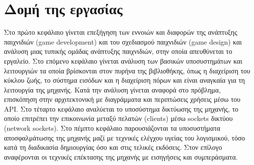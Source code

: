 \section{Δομή της εργασίας}
	Στο πρώτο κεφάλαιο γίνεται επεξήγηση των εννοιών και διαφορών της ανάπτυξης παιχνιδιών (game development) και του σχεδιασμού παιχνιδιών (game design) και ανάλυση μιας τυπικής ομάδας ανάπτυξης παιχνιδιών, στην οποία απευθύνεται το εργαλείο.
	Στο επόμενο κεφάλαιο γίνεται ανάλυση των βασικών υποσυστημάτων και λειτουργιών τα οποία βρίσκονται στον πυρήνα της βιβλιοθήκης, όπως η διαχείριση του κύκλου ζωής, το σύστημα εισόδων και η διαχείριση πόρων και είναι αναγκαία για τη λειτουργία της μηχανής. Κατά την ανάλυση γίνεται αναφορά στο πρόβλημα, επισκόπηση στην αρχιτεκτονική με διαγράμματα και περιπτώσεις χρήσεις μέσω του \gls{API}.
    Στο τέταρτο κεφάλαιο αναλύεται το υποσύστημα δικτύωσης της μηχανής, το οποίο επιτρέπει την επικοινωνία μεταξύ πελατών (clients) μέσω sockets δικτύου (network sockets).
	Στο πέμπτο κεφάλαιο παρουσιάζονται τα υποσυστήματα αποσφαλμάτωσης της μηχανής μαζί με τεχνικές ελέγχου υγείας του λογισμικού, τόσο κατά τη διαδικασία δημιουργίας όσο και στις τελικές εκδόσεις.
	Στον επίλογο αναφέρονται οι τεχνικές επέκτασης της μηχανής με εισηγήσεις και συμπεράσματα.
